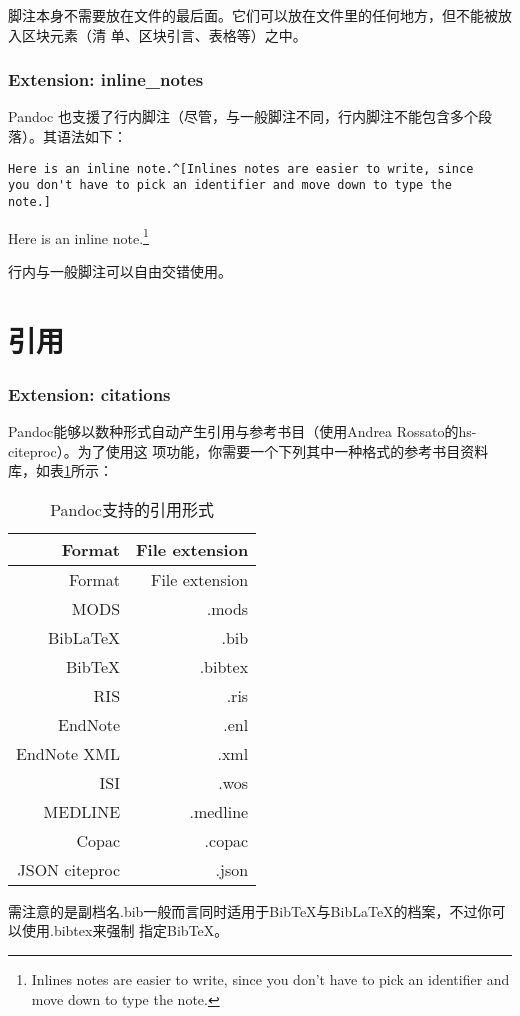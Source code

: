 \documentclass[fancyhdr,bookmark]{ctexbook}
\begin{document}
脚注本身不需要放在文件的最后面。它们可以放在文件里的任何地方，但不能被放入区块元素（清
单、区块引言、表格等）之中。

\subsubsection{Extension:
inline\_notes}\label{extension-inlineux5fnotes}

Pandoc
也支援了行内脚注（尽管，与一般脚注不同，行内脚注不能包含多个段落）。其语法如下：

\begin{lstlisting}
Here is an inline note.^[Inlines notes are easier to write, since
you don't have to pick an identifier and move down to type the
note.]
\end{lstlisting}

Here is an inline note.\footnote{Inlines notes are easier to write,
  since you don't have to pick an identifier and move down to type the
  note.}

行内与一般脚注可以自由交错使用。

\section{引用}\label{ux5f15ux7528-1}

\subsubsection{Extension: citations}\label{extension-citations}

Pandoc能够以数种形式自动产生引用与参考书目（使用Andrea
Rossato的hs-citeproc）。为了使用这
项功能，你需要一个下列其中一种格式的参考书目资料库，如表\ref{table:citations}所示：

\begin{longtable}[c]{@{}rr@{}}
\caption{\label{table:citations}Pandoc支持的引用形式}\tabularnewline
\toprule
Format & File extension\tabularnewline
\midrule
\endfirsthead
\toprule
Format & File extension\tabularnewline
\midrule
\endhead
MODS & .mods\tabularnewline
BibLaTeX & .bib\tabularnewline
BibTeX & .bibtex\tabularnewline
RIS & .ris\tabularnewline
EndNote & .enl\tabularnewline
EndNote XML & .xml\tabularnewline
ISI & .wos\tabularnewline
MEDLINE & .medline\tabularnewline
Copac & .copac\tabularnewline
JSON citeproc & .json\tabularnewline
\bottomrule
\end{longtable}

需注意的是副档名.bib一般而言同时适用于BibTeX与BibLaTeX的档案，不过你可以使用.bibtex来强制
指定BibTeX。
\end{document}
